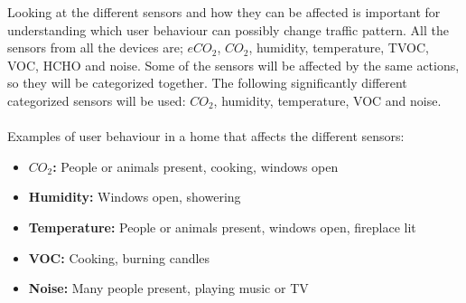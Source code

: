 Looking at the different sensors and how they can be affected is important for understanding which user behaviour can possibly change traffic pattern. All the sensors from all the devices are; \(eCO_2\), \(CO_2\), humidity, temperature, TVOC, VOC, HCHO and noise. Some of the sensors will be affected by the same actions, so they will be categorized together. The following significantly different categorized sensors will be used: \(CO_2\), humidity, temperature, VOC and noise. 
\\\\
Examples of user behaviour in a home that affects the different sensors:
\begin{itemize}
    \item \textbf{\(CO_2\):} People or animals present, cooking, windows open
    \item \textbf{Humidity:} Windows open, showering
    \item \textbf{Temperature:} People or animals present, windows open, fireplace lit
    \item \textbf{VOC:} Cooking, burning candles
    \item \textbf{Noise:} Many people present, playing music or TV
\end{itemize}

